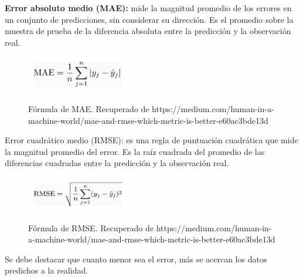 \textbf{Error absoluto medio (MAE):} mide la magnitud promedio de los errores en un conjunto de predicciones, sin considerar su dirección. Es el promedio sobre la muestra de prueba de la diferencia absoluta entre la predicción y la observación real.
\begin{figure}[h]
	\centering
	\caption{Fórmula de MAE. Recuperado de https://medium.com/human-in-a-machine-world/mae-and-rmse-which-metric-is-better-e60ac3bde13d}
	\includegraphics[width=0.4\textwidth]{recursos/mae}
	\label{fig:MAE}
\end{figure}
\FloatBarrier
Error cuadrático medio (RMSE): es una regla de puntuación cuadrática que mide la magnitud promedio del error. Es la raíz cuadrada del promedio de las diferencias cuadradas entre la predicción y la observación real.
\begin{figure}[h]
	\centering
	\caption{Fórmula de RMSE. Recuperado de https://medium.com/human-in-a-machine-world/mae-and-rmse-which-metric-is-better-e60ac3bde13d}
	\includegraphics[width=0.4\textwidth]{recursos/rmse}
	\label{fig:MAE}
\end{figure}
\FloatBarrier

Se debe destacar que cuanto menor sea el error, más se acercan los datos predichos a la realidad.

